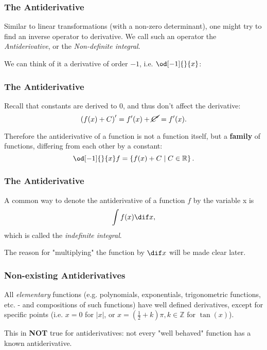 \begin{frame}
	\frametitle{The Antiderivative}
	Similar to linear transformations (with a non-zero determinant), one might try to find an inverse operator to derivative. We call such an operator the \emph{Antiderivative}, or the \emph{Non-definite integral}.

	We can think of it a derivative of order $-1$, i.e. $\od[-1]{}{x}$:

	\vspace{5mm}
	\centering
\end{frame}

\begin{frame}
	\frametitle{The Antiderivative}
	Recall that constants are derived to $0$, and thus don't affect the derivative:
	\begin{equation*}
		\left( f(x) + C \right)' = f'(x) + \cancel{C'} = f'(x).
	\end{equation*}

	Therefore the antiderivative of a function is not a function itself, but a \textbf{family} of functions, differing from each other by a constant:
	\begin{equation*}
		\od[-1]{}{x}f = \left\{ f(x)+C \mid C\in\mathbb{R} \right\}.
	\end{equation*}
\end{frame}

\begin{frame}
	\frametitle{The Antiderivative}
	A common way to denote the antiderivative of a function $f$ by the variable x is
	\begin{equation*}
		\int f(x) \dif x,
	\end{equation*}
	which is called the \emph{indefinite integral}.

	The reason for "multiplying" the function by $\dif x$ will be made clear later.
\end{frame}

\begin{frame}
	\frametitle{Non-existing Antiderivatives}
	All \emph{elementary} functions (e.g. polynomials, exponentials, trigonometric functions, etc. - and compositions of such functions) have well defined derivatives, except for specific points (i.e. $x=0$ for $|x|$, or $x=\left(\frac{1}{2}+k\right)\pi, k\in\mathbb{Z}$ for $\tan(x)$).

	This in \textbf{NOT} true for antiderivatives: not every "well behaved" function has a known antiderivative.
\end{frame}


